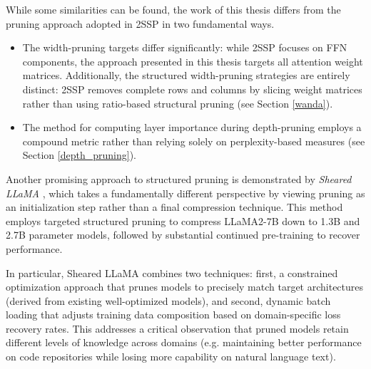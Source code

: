 While some similarities can be found, the work of this thesis differs from the pruning approach adopted in 2SSP in two fundamental ways.
\begin{itemize}
\item The width-pruning targets differ significantly: while 2SSP focuses on FFN components, the approach presented in this thesis targets all attention weight matrices. Additionally, the structured width-pruning strategies are entirely distinct: 2SSP removes complete rows and columns by slicing weight matrices rather than using ratio-based structural pruning (see Section \ref{wanda}).
\item The method for computing layer importance during depth-pruning employs a compound metric rather than relying solely on perplexity-based measures (see Section \ref{depth_pruning}).
\end{itemize}

Another promising approach to structured pruning is demonstrated by \textit{Sheared LLaMA} \cite{sheared_llama}, which takes a fundamentally different perspective by viewing pruning as an initialization step rather than a final compression technique. This method employs targeted structured pruning to compress LLaMA2-7B down to 1.3B and 2.7B parameter models, followed by substantial continued pre-training to recover performance.

In particular, Sheared LLaMA combines two techniques: first, a constrained optimization approach that prunes models to precisely match target architectures (derived from existing well-optimized models), and second, dynamic batch loading that adjusts training data composition based on domain-specific loss recovery rates. This addresses a critical observation that pruned models retain different levels of knowledge across domains (e.g. maintaining better performance on code repositories while losing more capability on natural language text).


